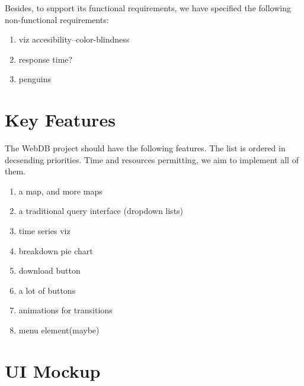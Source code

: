 \documentclass[12pt]{article}
\begin{document}
Besides, to support its functional requirements, we have specified the following non-functional requirements:
\begin{enumerate}
 \item viz accesibility--color-blindness
 \item response time?
 \item penguins
\end{enumerate}

\section{Key Features}
The WebDB project should have the following features. The list is ordered in decsending priorities. Time and resources
permitting, we aim to implement all of them.
\begin{enumerate}
 \item a map, and more maps
 \item a traditional query interface (dropdown lists)
 \item time series viz
 \item breakdown pie chart
 \item download button
 \item a lot of buttons
 \item animations for transitions
 \item menu element(maybe)
\end{enumerate}

\section{UI Mockup}
\end{document}
